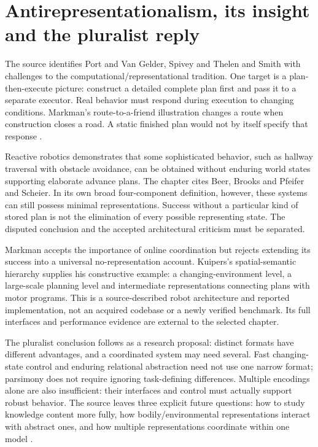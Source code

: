 \section{Antirepresentationalism, its insight and the pluralist reply}
\label{sec:p19-ckr-pluralism}

The source identifies Port and Van Gelder, Spivey and Thelen and
Smith with challenges to the computational/representational tradition.
One target is a plan-then-execute picture: construct a detailed
complete plan first and pass it to a separate executor. Real
behavior must respond during execution to changing conditions.
Markman's route-to-a-friend illustration changes a route when
construction closes a road. A static finished plan would not
by itself specify that response
\cite[pp.~48--49]{Markman2012CognitiveRepresentation}.

Reactive robotics demonstrates that some sophisticated behavior,
such as hallway traversal with obstacle avoidance, can be obtained
without enduring world states supporting elaborate advance plans.
The chapter cites Beer, Brooks and Pfeifer and Scheier. In its
own broad four-component definition, however, these systems can
still possess minimal representations. Success without a particular
kind of stored plan is not the elimination of every possible
representing state. The disputed conclusion and the accepted
architectural criticism must be separated.

Markman accepts the importance of online coordination but rejects
extending its success into a universal no-representation account.
Kuipers's spatial-semantic hierarchy supplies his constructive
example: a changing-environment level, a large-scale planning
level and intermediate representations connecting plans with
motor programs. This is a source-described robot architecture
and reported implementation, not an acquired codebase or a
newly verified benchmark. Its full interfaces and performance
evidence are external to the selected chapter.

The pluralist conclusion follows as a research proposal: distinct
formats have different advantages, and a coordinated system may
need several. Fast changing-state control and enduring relational
abstraction need not use one narrow format; parsimony does not
require ignoring task-defining differences. Multiple encodings
alone are also insufficient: their interfaces and control must
actually support robust behavior. The source leaves three explicit
future questions: how to study knowledge content more fully,
how bodily/environmental representations interact with abstract
ones, and how multiple representations coordinate within one model
\cite[p.~49]{Markman2012CognitiveRepresentation}.

